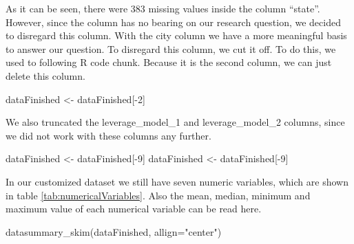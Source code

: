 \documentclass[
  11pt,
  a4paper,
  twoside]{scrbook}
\newenvironment{Shaded}{\begin{snugshade}}{\end{snugshade}}
\newcommand{\AttributeTok}[1]{\textcolor[rgb]{0.77,0.63,0.00}{#1}}
\newcommand{\DecValTok}[1]{\textcolor[rgb]{0.00,0.00,0.81}{#1}}
\newcommand{\FunctionTok}[1]{\textcolor[rgb]{0.00,0.00,0.00}{#1}}
\newcommand{\NormalTok}[1]{#1}
\newcommand{\OtherTok}[1]{\textcolor[rgb]{0.56,0.35,0.01}{#1}}
\newcommand{\SpecialCharTok}[1]{\textcolor[rgb]{0.00,0.00,0.00}{#1}}
\newcommand{\StringTok}[1]{\textcolor[rgb]{0.31,0.60,0.02}{#1}}
\begin{document}
As it can be seen, there were \(383\) missing values inside the column ``state''.
However, since the column has no bearing on our research question, we decided to disregard this column. With the city column we have a more meaningful basis to answer our question.
To disregard this column, we cut it off. To do this, we used to following R code chunk. Because it is the second column, we can just delete this column.

\linespread{1}

\begin{Shaded}
\begin{Highlighting}[]
\NormalTok{dataFinished }\OtherTok{\textless{}{-}}\NormalTok{ dataFinished[}\SpecialCharTok{{-}}\DecValTok{2}\NormalTok{]}
\end{Highlighting}
\end{Shaded}

\linespread{1}

We also truncated the leverage\_model\_1 and leverage\_model\_2 columns, since we did not work with these columns any further.

\linespread{1}

\begin{Shaded}
\begin{Highlighting}[]
\NormalTok{dataFinished }\OtherTok{\textless{}{-}}\NormalTok{ dataFinished[}\SpecialCharTok{{-}}\DecValTok{9}\NormalTok{]}
\NormalTok{dataFinished }\OtherTok{\textless{}{-}}\NormalTok{ dataFinished[}\SpecialCharTok{{-}}\DecValTok{9}\NormalTok{]}
\end{Highlighting}
\end{Shaded}

\linespread{1}

In our customized dataset we still have seven numeric variables, which are shown in table \ref{tab:numericalVariables}. Also the mean, median, minimum and maximum value of each numerical variable can be read here.

\linespread{1}

\begin{Shaded}
\begin{Highlighting}[]
\FunctionTok{datasummary\_skim}\NormalTok{(dataFinished, }\AttributeTok{allign=}\StringTok{"center"}\NormalTok{)}
\end{Highlighting}
\end{Shaded}

\linespread{1}
\end{document}
